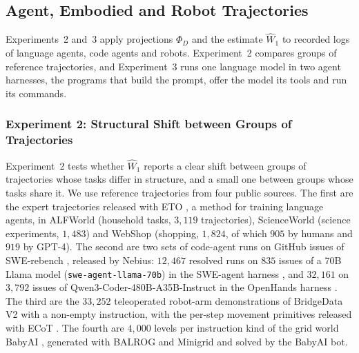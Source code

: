 \subsection{Agent, Embodied and Robot Trajectories}
\label{app:c2}

Experiments~2 and~3 apply projections $\Phi_D$ and the estimate $\widehat W_1$ to recorded logs of language agents, code agents and robots. Experiment~2 compares groups of reference trajectories, and Experiment~3 runs one language model in two agent harnesses, the programs that build the prompt, offer the model its tools and run its commands.

\subsubsection{Experiment 2: Structural Shift between Groups of Trajectories}
\label{app:c2-groups}

Experiment~2 tests whether $\widehat W_1$ reports a clear shift between groups of trajectories whose tasks differ in structure, and a small one between groups whose tasks share it. We use reference trajectories from four public sources. The first are the expert trajectories released with ETO \citep{song2024eto,song2024etodata}, a method for training language agents, in ALFWorld \citep{shridhar2021alfworld} (household tasks, $3{,}119$ trajectories), ScienceWorld \citep{wang2022scienceworld} (science experiments, $1{,}483$) and WebShop \citep{yao2022webshop} (shopping, $1{,}824$, of which $905$ by humans and $919$ by GPT-4). The second are two sets of code-agent runs on GitHub issues of SWE-rebench \citep{badertdinov2025swerebench}, released by Nebius: $12{,}467$ resolved runs on $835$ issues of a 70B Llama model (\texttt{swe-agent-llama-70b}) in the SWE-agent harness \citep{yang2024sweagent,nebius2024sweagenttrajectories}, and $32{,}161$ on $3{,}792$ issues of Qwen3-Coder-480B-A35B-Instruct \citep{qwen2025qwen3} in the OpenHands harness \citep{wang2025openhands,trofimova2025openhandstrajs}. The third are the $33{,}252$ teleoperated robot-arm demonstrations of BridgeData V2 \citep{walke2023bridgedata} with a non-empty instruction, with the per-step movement primitives released with ECoT \citep{zawalski2025ecot,embodiedcot2024bridgefeatures}. The fourth are $4{,}000$ levels per instruction kind of the grid world BabyAI \citep{chevalierboisvert2019babyai}, generated with BALROG \citep{paglieri2024balrog} and Minigrid \citep{chevalierboisvert2023minigrid} and solved by the BabyAI bot.

